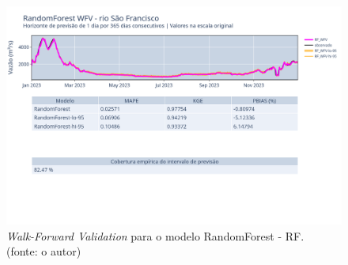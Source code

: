 \begin{figure}[!h]
\centering
\includegraphics[scale=0.33]{Figuras/rio_sao_francisco/wfv/RF/RF_WFV_ORIG.png}
\caption{\textit{Walk-Forward Validation} para o modelo RandomForest - RF.\\(fonte: o autor)}
\label{fig:francisco_RF_WFV_ORIG}
\end{figure}
\clearpage

